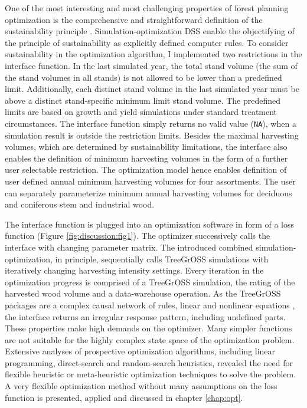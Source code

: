 One of the most interesting and most challenging properties of forest planning optimization is the comprehensive and straightforward definition of the sustainability principle \citep[p. 15]{kangas_2015}. Simulation-optimization DSS enable the objectifying of the principle of sustainability as explicitly defined computer rules. To consider sustainability in the optimization algorithm, I implemented two restrictions in the interface function. In the last simulated year, the total stand volume (the sum of the stand volumes in all stands) is not allowed to be lower than a predefined limit. Additionally, each distinct stand volume in the last simulated year must be above a distinct stand-specific minimum limit stand volume. The predefined limits are based on growth and yield simulations under standard treatment circumstances. The interface function simply returns no valid value ({\tt NA}), when a simulation result is outside the restriction limits. Besides the maximal harvesting volumes, which are determined by sustainability limitations, the interface also enables the definition of minimum harvesting volumes in the form of a further user selectable restriction. The optimization model hence enables definition of user defined annual minimum harvesting volumes for four assortments. The user can separately parameterize minimum annual harvesting volumes for deciduous and coniferous stem and industrial wood.

The interface function is plugged into an optimization software in form of a loss function (Figure \ref{fig:discussion:fig1}). The optimizer successively calls the interface with changing parameter matrix. The introduced combined si\-mu\-la\-tion-op\-ti\-mi\-za\-tion, in principle, sequentially calls TreeGrOSS simulations with iteratively changing harvesting intensity settings. Every iteration in the optimization progress is comprised of a TreeGrOSS simulation, the rating of the harvested wood volume and a data-warehouse operation. As the TreeGrOSS packages are a complex causal network of rules, linear and nonlinear equations \citep[p. 180]{hansen_2014}, the interface returns an irregular response pattern, including undefined parts. These properties make high demands on the optimizer. Many simpler functions are not suitable for the highly complex state space of the optimization problem. Extensive analyses of prospective optimization algorithms, including linear programming, direct-search and random-search heuristics, revealed the need for flexible heuristic or meta-heuristic optimization techniques to solve the problem. A very flexible optimization method without many assumptions on the loss function is presented, applied and discussed in chapter \ref{chap:opt}.

